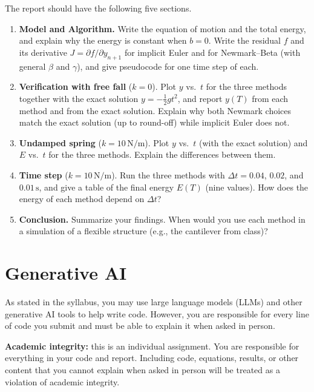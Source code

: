 \documentclass[letterpaper,11pt]{article}
\begin{document}
The report should have the following five sections.
\begin{enumerate}
    \item \textbf{Model and Algorithm.} Write the equation of motion and the total energy, and explain why the energy is constant when $b = 0$. Write the residual $f$ and its derivative $J = \partial f / \partial y_{n+1}$ for implicit Euler and for Newmark--Beta (with general $\beta$ and $\gamma$), and give pseudocode for one time step of each.
    \item \textbf{Verification with free fall} ($k = 0$). Plot $y$ vs.\ $t$ for the three methods together with the exact solution $y = -\frac{1}{2} g t^2$, and report $y(T)$ from each method and from the exact solution. Explain why both Newmark choices match the exact solution (up to round-off) while implicit Euler does not.
    \item \textbf{Undamped spring} ($k = 10\,\mathrm{N/m}$). Plot $y$ vs.\ $t$ (with the exact solution) and $E$ vs.\ $t$ for the three methods. Explain the differences between them.
    \item \textbf{Time step} ($k = 10\,\mathrm{N/m}$). Run the three methods with $\Delta t = 0.04$, $0.02$, and $0.01\,\mathrm{s}$, and give a table of the final energy $E(T)$ (nine values). How does the energy of each method depend on $\Delta t$?
    \item \textbf{Conclusion.} Summarize your findings. When would you use each method in a simulation of a flexible structure (e.g., the cantilever from class)?
\end{enumerate}

\section*{Generative AI}

As stated in the syllabus, you may use large language models (LLMs) and other generative AI tools to help write code. However, you are responsible for every line of code you submit and must be able to explain it when asked in person.

\textbf{Academic integrity:} this is an individual assignment. You are responsible for everything in your code and report. Including code, equations, results, or other content that you cannot explain when asked in person will be treated as a violation of academic integrity.
\end{document}
